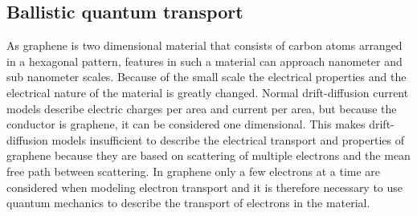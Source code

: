 \subsection{Ballistic quantum transport}
As graphene is two dimensional material that consists of carbon atoms arranged in a hexagonal pattern, features in such a material can approach nanometer and sub nanometer scales. Because of the small scale the electrical properties and the electrical nature of the material is greatly changed. Normal drift-diffusion current models describe electric charges per area and current per area, but because the conductor is graphene, it can be considered one dimensional. This makes drift-diffusion models insufficient to describe the electrical transport and properties of graphene because they are based on scattering of multiple electrons and the mean free path between scattering. In graphene only a few electrons at a time are considered when modeling electron transport and it is therefore necessary to use quantum mechanics to describe the transport of electrons in the material.
